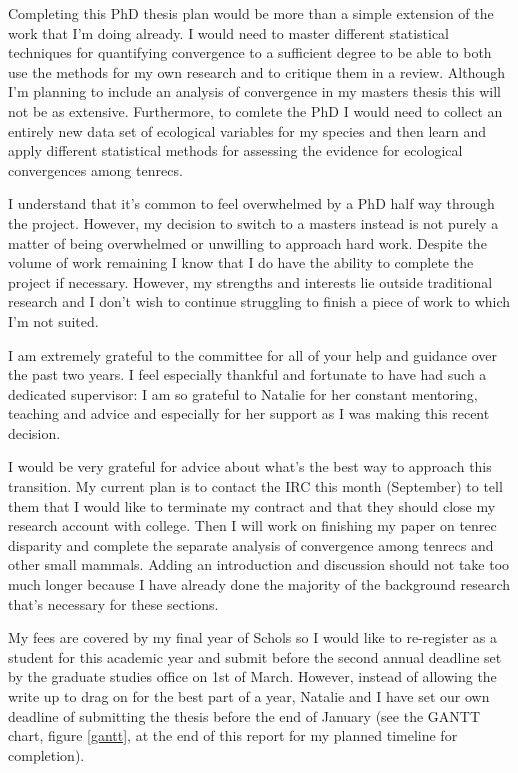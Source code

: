 \documentclass[12pt,a4paper]{article}
\begin{document}
	Completing this PhD thesis plan would be more than a simple extension of the work that I'm doing already. I would need to master different statistical techniques for quantifying convergence to a sufficient degree to be able to both use the methods for my own research and to critique them in a review. Although I'm planning to include an analysis of convergence in my masters thesis this will not be as extensive. Furthermore, to comlete the PhD I would need to collect an entirely new data set of ecological variables for my species and then learn and apply different statistical methods for assessing the evidence for ecological convergences among tenrecs.

	I understand that it's common to feel overwhelmed by a PhD half way through the project. However, my decision to switch to a masters instead is not purely a matter of being overwhelmed or unwilling to approach hard work. Despite the volume of work remaining I know that I do have the ability to complete the project if necessary. However, my strengths and interests lie outside traditional research and I don't wish to continue struggling to finish a piece of work to which I'm not suited.

	I am extremely grateful to the committee for all of your help and guidance over the past two years. I feel especially thankful and fortunate to have had such a dedicated supervisor: I am so grateful to Natalie for her constant mentoring, teaching and advice and especially for her support as I was making this recent decision.   

	I would be very grateful for advice about what's the best way to approach this transition. My current plan is to contact the IRC this month (September) to tell them that I would like to terminate my contract and that they should close my research account with college.  Then I will work on finishing my paper on tenrec disparity and complete the separate analysis of convergence among tenrecs and other small mammals. Adding an introduction and discussion should not take too much longer because I have already done the majority of the background research that's necessary for these sections.

	My fees are covered by my final year of Schols so I would like to re-register as a student for this academic year and submit before the second annual deadline set by the graduate studies office on 1st of March. However, instead of allowing the write up to drag on for the best part of a year, Natalie and I have set our own deadline of submitting the thesis before the end of January (see the GANTT chart, figure \ref*{gantt}, at the end of this report for my planned timeline for completion).
 
\end{document}
